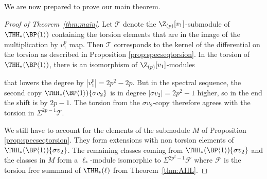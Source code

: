 We are now prepared to prove our main theorem.



\begin{proof}[Proof of Theorem~\ref{thm:main}]
Let $\mathcal{T}$ denote the $\Z_{(p)}[v_1]$-submodule of $\THH_*(\BP \langle 1 \rangle)$ containing the torsion elements that are in the image of the multiplication by $v_1^p$ map. Then $\mathcal{T}$ corresponds to the kernel of the differential on the torsion as described in Proposition \ref{prop:specseqtorsion}. In the torsion of $\THH_*(\BP \langle 1 \rangle)$, there is an isomorphism of $\Z_{(p)}[v_1]$-modules
  \begin{center}
  \end{center}
  that lowers the degree by $|v_1^p| = 2p^2 - 2p$. But in the spectral sequence, the second copy $\THH_*(\BP \langle 1 \rangle)\{ \sigma v_2\}$ is in degree $|\sigma v_2| = 2p^2 - 1$ higher, so in the end the shift is by $2p -1$. The torsion from the $\sigma v_2$-copy therefore agrees with the torsion in $\Sigma^{2p-1} \mathcal{T}$.


  We still have to account for the elements of the submodule $M$ of Proposition \ref{prop:specseqtorsion}. They form extensions with non torsion elements of $\THH_*(\BP \langle 1 \rangle)\{ \sigma v_2\}$. The remaining classes coming from $\THH_*(\BP \langle 1 \rangle)\{ \sigma v_2\}$ and the classes in $M$ form a $\ell_*$-module isomorphic to $\Sigma^{2p^2-1}\mathcal{F}$ where $\mathcal{F}$ is the torsion free summand of $\THH_*(\ell)$ from Theorem~\ref{thm:AHL}. 
\end{proof}


